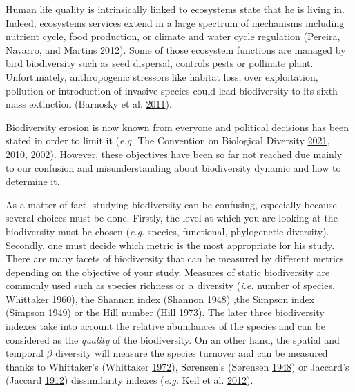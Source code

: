 \documentclass[
  12pt,
  oneside]{report}
\begin{document}
Human life quality is intrinsically linked to ecosystems state that he is living in. Indeed, ecosystems services extend in a large spectrum of mechanisms including nutrient cycle, food production, or climate and water cycle regulation (Pereira, Navarro, and Martins \protect\hyperlink{ref-pereira_global_2012}{2012}). Some of those ecosystem functions are managed by bird biodiversity such as seed dispersal, controls pests or pollinate plant. Unfortunately, anthropogenic stressors like habitat loss, over exploitation, pollution or introduction of invasive species could lead biodiversity to its sixth mass extinction (Barnosky et al. \protect\hyperlink{ref-barnosky_has_2011}{2011}).

Biodiversity erosion is now known from everyone and political decisions has been stated in order to limit it (\emph{e.g.} The Convention on Biological Diversity \protect\hyperlink{ref-the_convention_on_biological_diversity_convention_2021}{2021}, 2010, 2002). However, these objectives have been so far not reached due mainly to our confusion and misunderstanding about biodiversity dynamic and how to determine it.

As a matter of fact, studying biodiversity can be confusing, especially because several choices must be done. Firstly, the level at which you are looking at the biodiversity must be chosen (\emph{e.g.} species, functional, phylogenetic diversity). Secondly, one must decide which metric is the most appropriate for his study. There are many facets of biodiversity that can be measured by different metrics depending on the objective of your study. Measures of static biodiversity are commonly used such as species richness or \(\alpha\) diversity (\emph{i.e.} number of species, Whittaker \protect\hyperlink{ref-whittaker_vegetation_1960}{1960}), the Shannon index (Shannon \protect\hyperlink{ref-shannon_mathematical_1948}{1948}) ,the Simpson index (Simpson \protect\hyperlink{ref-simpson_measurement_1949}{1949}) or the Hill number (Hill \protect\hyperlink{ref-hill_diversity_1973}{1973}). The later three biodiversity indexes take into account the relative abundances of the species and can be considered as the \emph{quality} of the biodiversity. On an other hand, the spatial and temporal \(\beta\) diversity will measure the species turnover and can be measured thanks to Whittaker's (Whittaker \protect\hyperlink{ref-whittaker_evolution_1972}{1972}), Sørensen's (Sørensen \protect\hyperlink{ref-sorensen_method_1948}{1948}) or Jaccard's (Jaccard \protect\hyperlink{ref-jaccard_distribution_1912}{1912}) dissimilarity indexes (\emph{e.g.} Keil et al. \protect\hyperlink{ref-keil_patterns_2012}{2012}).
\end{document}

